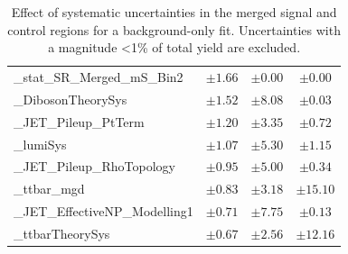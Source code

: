 \begin{table}[h]
\begin{tabular*}{\textwidth}{@{\extracolsep{\fill}}lccc}
		\gamma\_stat\_SR\_Merged\_mS\_Bin2         & $\pm 1.66$          & $\pm 0.00$          & $\pm 0.00$       \\
		\alpha\_DibosonTheorySys         & $\pm 1.52$          & $\pm 8.08$          & $\pm 0.03$       \\
		\alpha\_JET\_Pileup\_PtTerm         & $\pm 1.20$          & $\pm 3.35$          & $\pm 0.72$       \\
		\alpha\_lumiSys         & $\pm 1.07$          & $\pm 5.30$          & $\pm 1.15$       \\
		\alpha\_JET\_Pileup\_RhoTopology         & $\pm 0.95$          & $\pm 5.00$          & $\pm 0.34$       \\
		\mu\_ttbar\_mgd         & $\pm 0.83$          & $\pm 3.18$          & $\pm 15.10$       \\
		\alpha\_JET\_EffectiveNP\_Modelling1         & $\pm 0.71$          & $\pm 7.75$          & $\pm 0.13$       \\
		\alpha\_ttbarTheorySys         & $\pm 0.67$          & $\pm 2.56$          & $\pm 12.16$       \\
		\bottomrule
		\end{tabular*}
		\caption{Effect of systematic uncertainties in the merged signal and control regions for a background-only fit. Uncertainties with a magnitude <1\% of total yield are excluded.}
		\label{tab:systs_mgd}
		\end{table}

